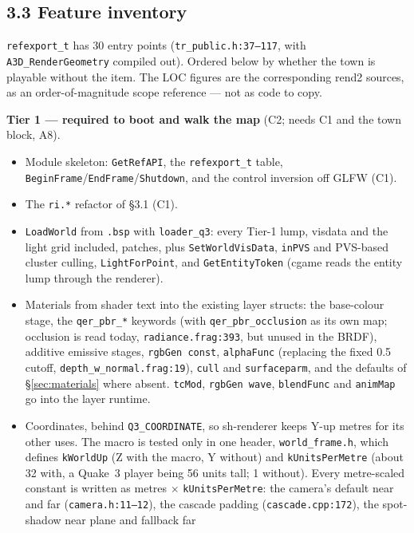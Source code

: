 \documentclass[11pt,a4paper]{article}
\begin{document}
\subsection{3.3 Feature inventory}

\texttt{refexport\_t} has 30 entry points (\texttt{tr\_public.h:37--117}, with
\texttt{A3D\_RenderGeometry} compiled out). Ordered below by whether the town is playable without
the item. The LOC figures are the corresponding rend2 sources, as an order-of-magnitude scope
reference --- not as code to copy.

\textbf{Tier 1 --- required to boot and walk the map} (C2; needs C1 and the town block, A8).
\begin{itemize}
\item Module skeleton: \texttt{GetRefAPI}, the \texttt{refexport\_t} table,
  \texttt{BeginFrame}/\texttt{EndFrame}/\texttt{Shutdown}, and the control inversion off GLFW
  (C1).
\item The \texttt{ri.*} refactor of §3.1 (C1).
\item \texttt{LoadWorld} from \texttt{.bsp} with \texttt{loader\_q3}: every Tier-1 lump,
  visdata and the light grid included, patches, plus \texttt{SetWorldVisData}, \texttt{inPVS} and
  PVS-based cluster culling, \texttt{LightForPoint}, and \texttt{GetEntityToken} (cgame reads the
  entity lump through the renderer).
\item Materials from shader text into the existing layer structs: the base-colour stage, the
  \texttt{qer\_pbr\_*} keywords (with \texttt{qer\_pbr\_occlusion} as its own map; occlusion is
  read today, \texttt{radiance.frag:393}, but unused in the BRDF), additive emissive stages,
  \texttt{rgbGen const}, \texttt{alphaFunc} (replacing the fixed 0.5 cutoff,
  \texttt{depth\_w\_normal.frag:19}), \texttt{cull} and \texttt{surfaceparm}, and the defaults of
  §\ref{sec:materials} where absent. \texttt{tcMod}, \texttt{rgbGen wave}, \texttt{blendFunc} and
  \texttt{animMap} go into the layer runtime.
\item Coordinates, behind \texttt{Q3\_COORDINATE}, so sh-renderer keeps Y-up metres for its other
  uses. The macro is tested only in one header, \texttt{world\_frame.h}, which defines
  \texttt{kWorldUp} (Z with the macro, Y without) and \texttt{kUnitsPerMetre} (about 32 with,
  a Quake~3 player being 56 units tall; 1 without). Every metre-scaled constant is written as metres
  $\times$ \texttt{kUnitsPerMetre}: the camera's default near and far (\texttt{camera.h:11--12}), the
  cascade padding (\texttt{cascade.cpp:172}), the spot-shadow near plane and fallback far

\end{itemize}
\end{document}
